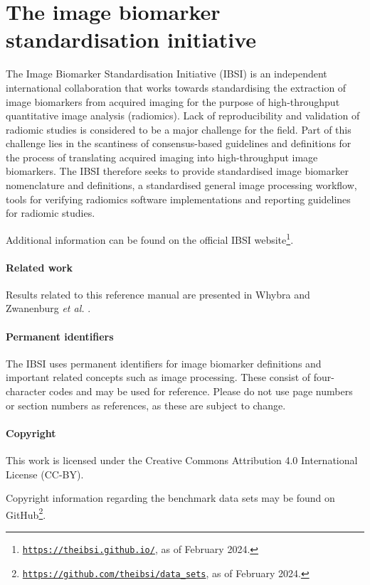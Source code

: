 \documentclass[fleqn,a4paper,oneside,openany]{book}
\begin{document}
\newpage
\chapter*{The image biomarker standardisation initiative}
The Image Biomarker Standardisation Initiative (IBSI) is an independent international collaboration that works towards standardising the extraction of image biomarkers from acquired imaging for the purpose of high-throughput quantitative image analysis (radiomics). Lack of reproducibility and validation of radiomic studies is considered to be a major challenge for the field. Part of this challenge lies in the scantiness of consensus-based guidelines and definitions for the process of translating acquired imaging into high-throughput image biomarkers. The IBSI therefore seeks to provide standardised image biomarker nomenclature and definitions, a standardised general image processing workflow, tools for verifying radiomics software implementations and reporting guidelines for radiomic studies.

Additional information can be found on the official IBSI website\footnote{\texttt{\url{https://theibsi.github.io/}}, as of February 2024.}.

\subsubsection*{Related work}
Results related to this reference manual are presented in Whybra and Zwanenburg \emph{et al.} \cite{Whybra2024-yb}.

\subsubsection*{Permanent identifiers}
The IBSI uses permanent identifiers for image biomarker definitions and important related concepts such as image processing. These consist of four-character codes and may be used for reference. Please do not use page numbers or section numbers as references, as these are subject to change.

\subsubsection*{Copyright}
This work is licensed under the Creative Commons Attribution 4.0 International License (CC-BY).

Copyright information regarding the benchmark data sets may be found on GitHub\footnote{\texttt{\url{https://github.com/theibsi/data\_sets}}, as of February 2024.}.
\end{document}
